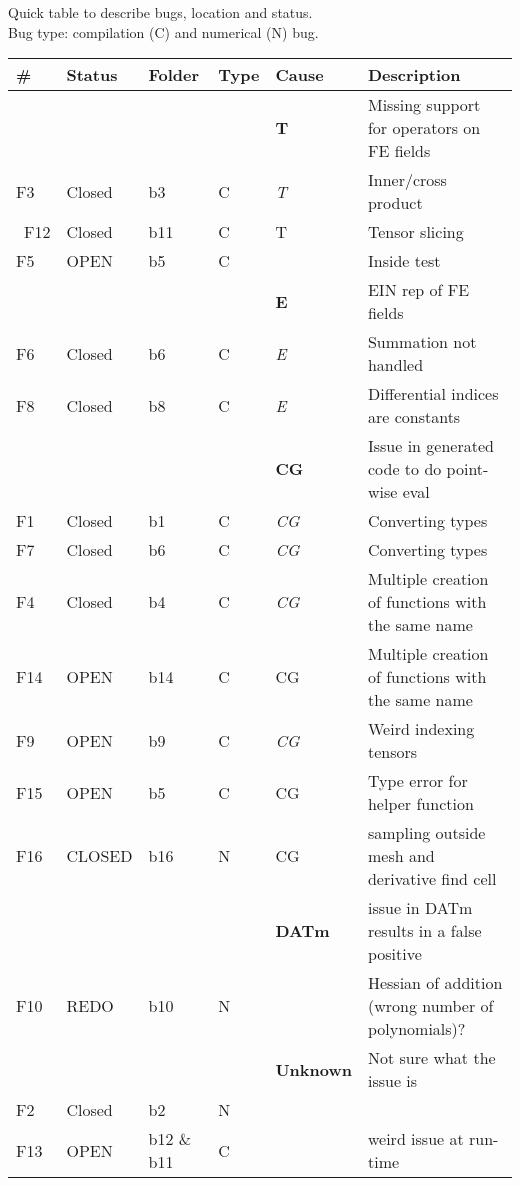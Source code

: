 \documentclass{article}
\newcommand{\fontit}[1]{\textit{#1}}
\begin{document}
Quick table to describe bugs, location and status.\\
Bug type: compilation (C) and numerical (N) bug.\\
\newline 
\begin{tabular}{|l|ll|lll|}
\hline
\# & Status & Folder&Type & Cause & Description \\
\hline
&&&&\textbf{T}& Missing support for operators on FE fields\\
 F3 &Closed&b3  & C &\fontit{T}& Inner/cross product  \\\
  F12 &Closed & b11 & C &T & Tensor slicing\\
   F5 &OPEN&b5 &C && Inside test\\
&&&&\textbf{E}& EIN rep of FE fields\\
 F6 &Closed &b6 &C &\fontit{E} & Summation not handled \\
  F8 &Closed &b8 &C &  \fontit{E}&Differential indices are constants\\
&&&&\textbf{CG}& Issue in generated code  to do point-wise eval\\
 F1 &Closed& b1 & C &\fontit{CG}& Converting types\\
F7 &Closed& b6  &C & \fontit{CG}& Converting types\\
 F4 &Closed&b4  & C &\fontit{CG}&Multiple creation of functions with the same name \\
F14 &OPEN & b14 &C& CG&Multiple creation of functions with the same name\\
   F9 &OPEN&b9 &C &  \fontit{CG}& Weird indexing tensors\\
 F15 &OPEN&b5 &C & CG & Type error for helper function\\
  F16 &CLOSED & b16 & N  & CG & sampling outside mesh and derivative find cell  \\
&&&&\textbf{DATm}& issue in DATm results in a false positive\\
 F10 &REDO &b10 &N &&  Hessian of addition (wrong number of polynomials)?\\
&&&&\textbf{Unknown}& Not sure what the issue is\\
 F2 &Closed &b2 & N & &\\
  F13 &OPEN & b12 \& b11 &  C&  &weird issue at run-time\\


\hline
\end{tabular}
\\
\end{document}
